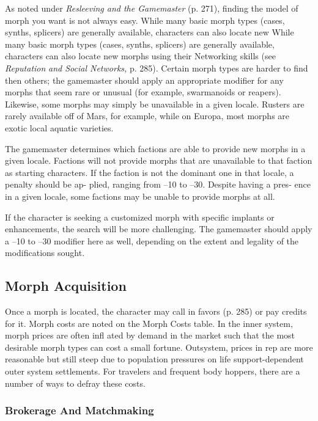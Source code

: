 As noted under \textit{Resleeving and the Gamemaster} (p. 271), 
finding the model of morph you want is not always easy. 
While many basic morph types (cases, synths, splicers) 
are generally available, characters can also locate new 
While many basic morph types (cases, synths, splicers)
are generally available, characters can also locate new 
morphs using their Networking skills (see \textit{Reputation }
\textit{and Social Networks,} p. 285). Certain morph types 
are harder to find then others; the gamemaster should 
apply an appropriate modifier for any morphs that seem 
rare or unusual (for example, swarmanoids or reapers). 
Likewise, some morphs may simply be unavailable in a 
given locale. Rusters are rarely available off of Mars, for 
example, while on Europa, most morphs are exotic local 
aquatic varieties.

The gamemaster determines which factions are able 
to provide new morphs in a given locale. Factions 
will not provide morphs that are unavailable to that 
faction as starting characters. If the faction is not the 
dominant one in that locale, a penalty should be ap-
plied, ranging from –10 to –30. Despite having a pres-
ence in a given locale, some factions may be unable to 
provide morphs at all.

If the character is seeking a customized morph with 
specific implants or enhancements, the search will be 
more challenging. The gamemaster should apply a –10 
to –30 modifier here as well, depending on the extent 
and legality of the modifications sought.

\subsection{Morph Acquisition}

Once a morph is located, the character may call in 
favors (p. 285) or pay credits for it. Morph costs are 
noted on the Morph Costs table. In the inner system, 
morph prices are often infl ated by demand in the 
market such that the most desirable morph types can 
cost a small fortune. Outsystem, prices in rep are more 
reasonable but still steep due to population pressures 
on life support-dependent outer system settlements. 
For travelers and frequent body hoppers, there are a 
number of ways to defray these costs.

\subsubsection{Brokerage And Matchmaking}

